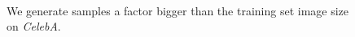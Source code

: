 \documentclass{article}
\begin{document}
\begin{figure}[H]
\vspace{0pt}
    \centering {} \\
    \caption{We generate samples a factor bigger than the training set image size on \emph{CelebA}.}
\vspace{0pt}
\end{figure}
\end{document}
